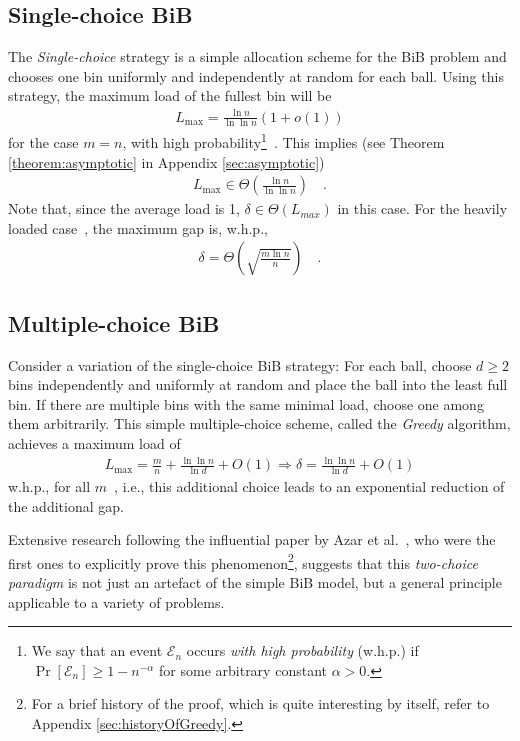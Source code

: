 \documentclass[a4paper,12pt]{article}
\newcommand\load{L_{\mathrm{max}}}
\begin{document}
\subsection{Single-choice BiB}
\label{sec:single-choice}
The \emph{Single-choice} strategy is a simple allocation scheme for the BiB problem and chooses one bin uniformly and independently at random for each ball. Using this strategy, the maximum load of the fullest bin will be
\begin{align*}
\load = \frac{\ln n}{\ln \ln n}  \left(1 + o\left(1\right)\right)
\end{align*}
for the case $m=n$, with high probability\footnote{We say that an event $\mathcal E_n$ occurs \emph{with high probability} (w.h.p.) if $\Pr\left[\mathcal E_n \right] \geq 1 - n^{-\alpha}$ for some arbitrary constant $\alpha > 0$.}~\cite{RS98}. This implies (see Theorem \ref{theorem:asymptotic} in Appendix \ref{sec:asymptotic})
\begin{align*}
\load\in \Theta\left(\frac{\ln n}{\ln \ln n}\right)\quad .
\end{align*}
Note that, since the average load is 1, $\delta \in \Theta\left( L_{max} \right)$ in this case. For the heavily loaded case~\cite{RS98}, the maximum gap is, w.h.p.,
\begin{align*}
\delta = \Theta\left(\sqrt{\frac{m  \ln n}{n}}\right)\quad .
\end{align*}

\subsection{Multiple-choice BiB}
Consider a variation of the  single-choice BiB strategy: For each ball, choose $d \geq 2$ bins independently and uniformly at random and place the ball into the least full bin. If there are multiple bins with the same minimal load, choose one among them arbitrarily. This simple multiple-choice scheme, called the \emph{Greedy} algorithm, achieves a maximum load of
\begin{align*}
\load = \frac{m}{n}+\frac{\ln \ln n}{\ln d} + O(1) \Rightarrow \delta = \frac{\ln \ln n}{\ln d} + O(1)
\end{align*}
w.h.p., for all $m$~\cite{ABKU99, BCSV06}, i.e., this additional choice leads to an exponential reduction of the additional gap. 
\begin{comment}
Curiously, the exponential decrease in the gap is already achieved having just two choices (that is, $d=2$). Each additional choice decreases the bound for the maximum gap by just a constant factor~\cite{MRS01}. 
\end{comment}
Extensive research following the influential paper by Azar et al.~\cite{ABKU99}, who were the first ones to explicitly prove this phenomenon\footnote{For a brief history of the proof, which is quite interesting by itself, refer to Appendix \ref{sec:historyOfGreedy}.}, suggests that this \emph{two-choice paradigm} is not just an artefact of the simple BiB model, but a general principle applicable to a variety of problems. 
\end{document}
